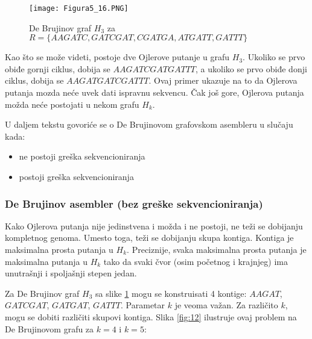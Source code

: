\documentclass[12pt,oneside]{memoir}
\begin{document}
\begin{figure}[!ht]
\centering
\texttt{[image: Figura5\_16.PNG]}
\caption{De Brujinov graf $H_3$ za $R = \{AAGATC, GATCGAT, CGATGA, ATGATT, GATTT\}$ }
\label{fig:10}
\end{figure}

Kao što se može videti, postoje dve Ojlerove putanje u grafu $H_3$. Ukoliko se prvo obiđe gornji ciklus, dobija se $AAGATCGATGATTT$, a ukoliko se prvo obiđe donji ciklus, dobija se $AAGATGATCGATTT$. Ovaj primer ukazuje na to da Ojlerova putanja mozda neće uvek dati ispravnu sekvencu. Čak još gore, Ojlerova putanja možda neće postojati u nekom grafu $H_k$.

U daljem tekstu govoriće se o De Brujinovom grafovskom asembleru u slučaju kada:
\begin{itemize}
    \item{ne postoji greška sekvencioniranja}
    \item{postoji greška sekvencioniranja}
\end{itemize}

\subsubsection{De Brujinov asembler (bez greške sekvencioniranja)}

Kako Ojlerova putanja nije jedinstvena i možda i ne postoji, ne teži se dobijanju kompletnog genoma. Umesto toga, teži se dobijanju skupa kontiga. Kontiga je maksimalna prosta putanja u $H_k$. Preciznije, svaka maksimalna prosta putanja je maksimalna putanja u $H_k$ tako da svaki čvor (osim početnog i krajnjeg) ima unutrašnji i spoljašnji stepen jedan. 

\begin{comment}
Slika \ref{fig:11} daje pseudokod ovog jednostavnog metoda:


\begin{figure}[!ht]
\centering
\texttt{[image: Figura5\_17.PNG]}
\caption{Jednstavan De Brujinov grafovski asmbler}
\label{fig:11}
\source{\cite{WingKinSung} str. 141, slika 5.17}
\end{figure}

\end{comment}

Za De Brujinov graf $H_3$ sa slike \ref{fig:10} mogu se konstruisati 4 kontige: $AAGAT$, $GATCGAT$, $GATGAT$, $GATTT$. Parametar $k$ je veoma važan. Za različito $k$, mogu se dobiti različiti skupovi kontiga. Slika \ref{fig:12} ilustruje ovaj problem na De Brujinovom grafu za $k = 4$ i $k = 5$:
\end{document}
